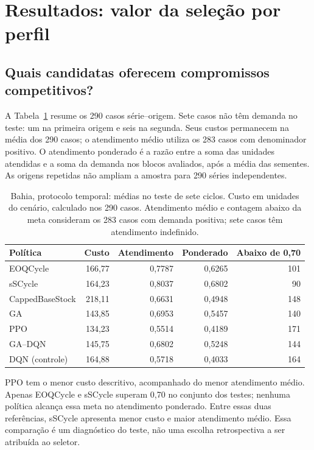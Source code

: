 \section{Resultados: valor da seleção por perfil}
\label{sec:ba2026}

\subsection{Quais candidatas oferecem compromissos competitivos?}

A Tabela~\ref{tab:ba2026_portfolio} resume os 290 casos série--origem. Sete casos não têm demanda no teste: um na primeira origem e seis na segunda. Seus custos permanecem na média dos 290 casos; o atendimento médio utiliza os 283 casos com denominador positivo. O atendimento ponderado é a razão entre a soma das unidades atendidas e a soma da demanda nos blocos avaliados, após a média das sementes. As origens repetidas não ampliam a amostra para 290 séries independentes.

\begin{table}[htbp]
\centering\small
\caption{Bahia, protocolo temporal: médias no teste de sete ciclos. Custo em unidades do cenário, calculado nos 290 casos. Atendimento médio e contagem abaixo da meta consideram os 283 casos com demanda positiva; sete casos têm atendimento indefinido.}
\label{tab:ba2026_portfolio}
\begin{tabular}{@{}lrrrr@{}}\toprule
Política & Custo & Atendimento & Ponderado & Abaixo de 0,70\\\midrule
EOQCycle &166,77&0,7787&0,6265&101\\
sSCycle &164,23&0,8037&0,6802&90\\
CappedBaseStock &218,11&0,6631&0,4948&148\\
GA &143,85&0,6953&0,5457&140\\
PPO &134,23&0,5514&0,4189&171\\
GA--DQN &145,75&0,6802&0,5248&144\\
DQN (controle) &164,88&0,5718&0,4033&164\\
\bottomrule\end{tabular}
\end{table}

PPO tem o menor custo descritivo, acompanhado do menor atendimento médio. Apenas EOQCycle e sSCycle superam 0,70 no conjunto dos testes; nenhuma política alcança essa meta no atendimento ponderado. Entre essas duas referências, sSCycle apresenta menor custo e maior atendimento médio. Essa comparação é um diagnóstico do teste, não uma escolha retrospectiva a ser atribuída ao seletor.

